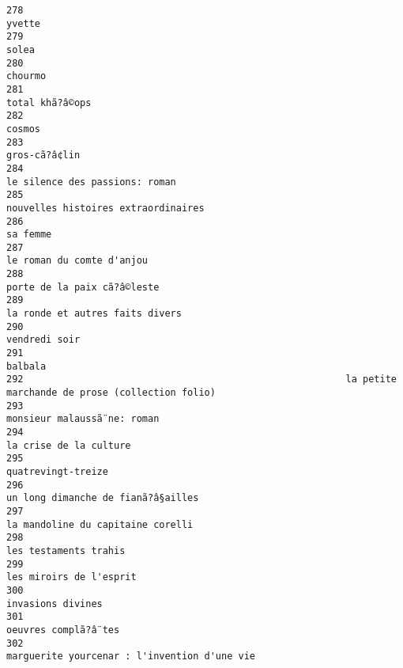 \documentclass[
]{report}
\begin{document}
\begin{verbatim}
278                                                                                                  yvette
279                                                                                                   solea
280                                                                                                 chourmo
281                                                                                         total khã?â©ops
282                                                                                                  cosmos
283                                                                                           gros-cã?â¢lin
284                                                                          le silence des passions: roman
285                                                                     nouvelles histoires extraordinaires
286                                                                                                sa femme
287                                                                               le roman du comte d'anjou
288                                                                             porte de la paix cã?â©leste
289                                                                         la ronde et autres faits divers
290                                                                                           vendredi soir
291                                                                                                 balbala
292                                                         la petite marchande de prose (collection folio)
293                                                                             monsieur malaussã¨ne: roman
294                                                                                  la crise de la culture
295                                                                                      quatrevingt-treize
296                                                                      un long dimanche de fianã?â§ailles
297                                                                       la mandoline du capitaine corelli
298                                                                                   les testaments trahis
299                                                                                 les miroirs de l'esprit
300                                                                                       invasions divines
301                                                                                    oeuvres complã?â¨tes
302                                                            marguerite yourcenar : l'invention d'une vie

\end{verbatim}
\end{document}
